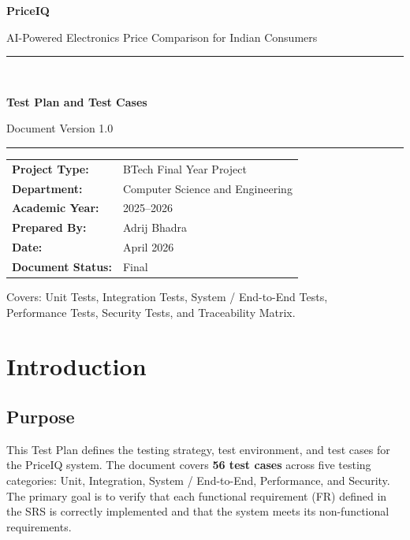 \documentclass[12pt,a4paper]{report}
\begin{document}
\begin{titlepage}
  \centering
  \vspace*{1.8cm}
  {\Huge\bfseries\color{priblue} PriceIQ\par}
  \vspace{0.4cm}
  {\large AI-Powered Electronics Price Comparison for Indian Consumers\par}
  \vspace{1.4cm}
  \rule{0.85\linewidth}{1.5pt}\\[0.5cm]
  {\LARGE\bfseries Test Plan and Test Cases\par}
  \vspace{0.3cm}
  {\large Document Version 1.0\par}
  \rule{0.85\linewidth}{1.5pt}
  \vspace{1.8cm}

  \begin{tabular}{@{}ll@{}}
    \textbf{Project Type:}    & BTech Final Year Project \\[4pt]
    \textbf{Department:}      & Computer Science and Engineering \\[4pt]
    \textbf{Academic Year:}   & 2025--2026 \\[4pt]
    \textbf{Prepared By:}     & Adrij Bhadra \\[4pt]
    \textbf{Date:}            & April 2026 \\[4pt]
    \textbf{Document Status:} & Final \\
  \end{tabular}

  \vfill
  {\small Covers: Unit Tests, Integration Tests, System / End-to-End Tests,\\
  Performance Tests, Security Tests, and Traceability Matrix.}
\end{titlepage}

\tableofcontents
\newpage

\chapter{Introduction}

\section{Purpose}
This Test Plan defines the testing strategy, test environment, and test cases
for the PriceIQ system. The document covers \textbf{56 test cases} across five
testing categories: Unit, Integration, System / End-to-End, Performance, and
Security. The primary goal is to verify that each functional requirement (FR)
defined in the SRS is correctly implemented and that the system meets its
non-functional requirements.
\end{document}
